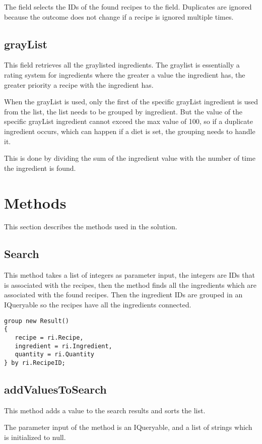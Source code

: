 The field selects the IDs of the found recipes to the field. Duplicates are ignored because the outcome does not change if a recipe is ignored multiple times.

\subsection{grayList}\label{ssc:graylist}
This field retrieves all the graylisted ingredients. The graylist is essentially a rating system for ingredients where the greater a value the ingredient has, the greater priority a recipe with the ingredient has.

When the grayList is used, only the first of the specific grayList ingredient is used from the list, the list needs to be grouped by ingredient. But the value of the specific grayList ingredient cannot exceed the max value of 100, so if a duplicate ingredient occurs, which can happen if a diet is set, the grouping needs to handle it. 

This is done by dividing the sum of the ingredient value with the number of time the ingredient is found. 

\section{Methods}
This section describes the methods used in the solution.
\subsection{Search}
This method takes a list of integers as parameter input, the integers are IDs that is associated with the recipes, then the method finds all the ingredients which are associated with the found recipes. Then the ingredient IDs are grouped in an IQueryable so the recipes have all the ingredients connected.

\begin{lstlisting}[caption=ResultGrouping, label={lst:ResultGrouping}, language=CSharp]
group new Result()
{
   recipe = ri.Recipe,
   ingredient = ri.Ingredient,
   quantity = ri.Quantity
} by ri.RecipeID;
\end{lstlisting}

\subsection{addValuesToSearch}
This method adds a value to the search results and sorts the list.

The parameter input of the method is an IQueryable, and a list of strings which is initialized to null.

